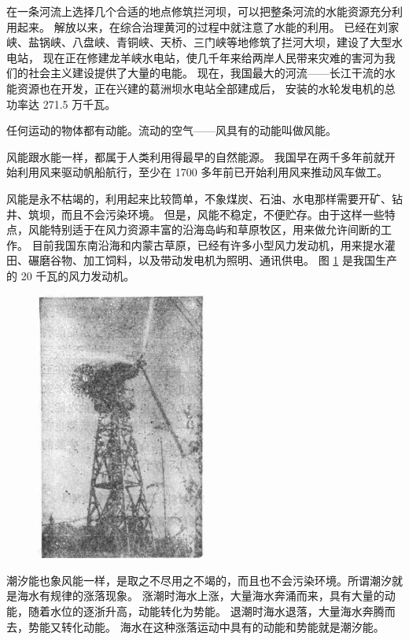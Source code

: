在一条河流上选择几个合适的地点修筑拦河坝，可以把整条河流的水能资源充分利用起来。
解放以来，在综合治理黄河的过程中就注意了水能的利用。
已经在刘家峡、盐锅峡、八盘峡、青铜峡、天桥、三门峡等地修筑了拦河大坝，建设了大型水电站，
现在正在修建龙羊峡水电站，使几千年来给两岸人民带来灾难的害河为我们的社会主义建设提供了大量的电能。
现在，我国最大的河流——长江干流的水能资源也在开发，正在兴建的葛洲坝水电站全部建成后，
安装的水轮发电机的总功率达 271.5 万千瓦。




任何运动的物体都有动能。流动的空气——风具有的动能叫做风能。

风能跟水能一样，都属于人类利用得最早的自然能源。
我国早在两千多年前就开始利用风来驱动帆船航行，至少在 1700 多年前已开始利用风来推动风车做工。

风能是永不枯竭的，利用起来比较筒单，不象煤炭、石油、水电那样需要开矿、钻井、筑坝，而且不会污染环境。
但是，风能不稳定，不便贮存。由于这样一些特点，风能特别适于在风力资源丰富的沿海岛屿和草原牧区，用来做允许间断的工作。
目前我国东南沿海和内蒙古草原，已经有许多小型风力发动机，用来提水灌田、碾磨谷物、加工饲料，以及带动发电机为照明、通讯供电。
图 \ref{fig:8-17} 是我国生产的 20 千瓦的风力发动机。

\begin{figure}[htbp]
    \centering
    \includegraphics[width=0.5\textwidth]{../pic/czwl1-ch8-17}
    \caption{}\label{fig:8-17}
\end{figure}


潮汐能也象风能一样，是取之不尽用之不竭的，而且也不会污染环境。所谓潮汐就是海水有规律的涨落现象。
涨潮时海水上涨，大量海水奔涌而来，具有大量的动能，随着水位的逐浙升高，动能转化为势能。
退潮时海水退落，大量海水奔腾而去，势能又转化动能。
海水在这种涨落运动中具有的动能和势能就是潮汐能。

